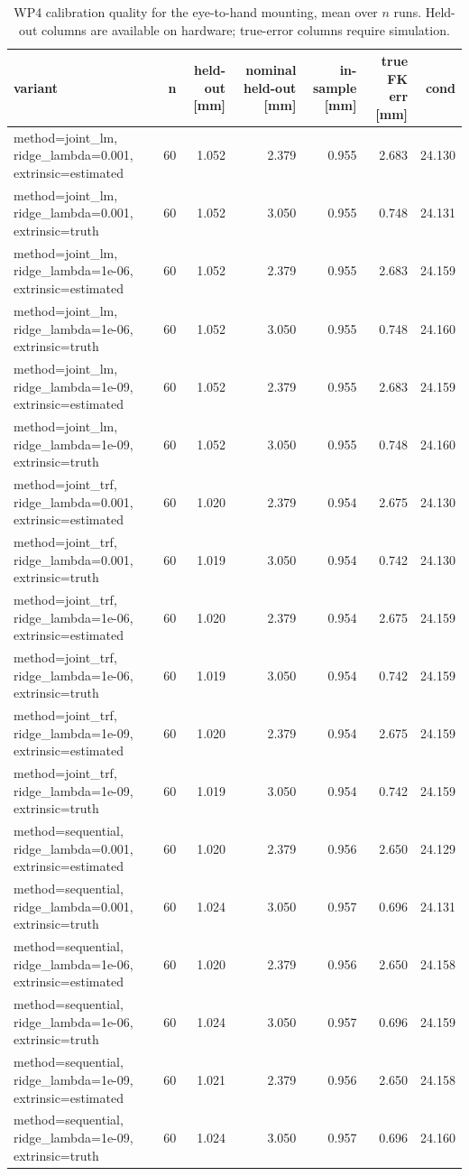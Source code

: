 \begin{table}[htbp]
  \centering
  \caption{WP4 calibration quality for the eye-to-hand mounting, mean over $n$ runs. Held-out columns are available on hardware; true-error columns require simulation.}
  \label{tab:wp4-summary-eye-to-hand}
  \begin{tabular}{lrrrrrr}
    \toprule
    variant & n & held-out [mm] & nominal held-out [mm] & in-sample [mm] & true FK err [mm] & cond \\
    \midrule
    method=joint\_lm, ridge\_lambda=0.001, extrinsic=estimated & 60 & 1.052 & 2.379 & 0.955 & 2.683 & 24.130 \\
    method=joint\_lm, ridge\_lambda=0.001, extrinsic=truth & 60 & 1.052 & 3.050 & 0.955 & 0.748 & 24.131 \\
    method=joint\_lm, ridge\_lambda=1e-06, extrinsic=estimated & 60 & 1.052 & 2.379 & 0.955 & 2.683 & 24.159 \\
    method=joint\_lm, ridge\_lambda=1e-06, extrinsic=truth & 60 & 1.052 & 3.050 & 0.955 & 0.748 & 24.160 \\
    method=joint\_lm, ridge\_lambda=1e-09, extrinsic=estimated & 60 & 1.052 & 2.379 & 0.955 & 2.683 & 24.159 \\
    method=joint\_lm, ridge\_lambda=1e-09, extrinsic=truth & 60 & 1.052 & 3.050 & 0.955 & 0.748 & 24.160 \\
    method=joint\_trf, ridge\_lambda=0.001, extrinsic=estimated & 60 & 1.020 & 2.379 & 0.954 & 2.675 & 24.130 \\
    method=joint\_trf, ridge\_lambda=0.001, extrinsic=truth & 60 & 1.019 & 3.050 & 0.954 & 0.742 & 24.130 \\
    method=joint\_trf, ridge\_lambda=1e-06, extrinsic=estimated & 60 & 1.020 & 2.379 & 0.954 & 2.675 & 24.159 \\
    method=joint\_trf, ridge\_lambda=1e-06, extrinsic=truth & 60 & 1.019 & 3.050 & 0.954 & 0.742 & 24.159 \\
    method=joint\_trf, ridge\_lambda=1e-09, extrinsic=estimated & 60 & 1.020 & 2.379 & 0.954 & 2.675 & 24.159 \\
    method=joint\_trf, ridge\_lambda=1e-09, extrinsic=truth & 60 & 1.019 & 3.050 & 0.954 & 0.742 & 24.159 \\
    method=sequential, ridge\_lambda=0.001, extrinsic=estimated & 60 & 1.020 & 2.379 & 0.956 & 2.650 & 24.129 \\
    method=sequential, ridge\_lambda=0.001, extrinsic=truth & 60 & 1.024 & 3.050 & 0.957 & 0.696 & 24.131 \\
    method=sequential, ridge\_lambda=1e-06, extrinsic=estimated & 60 & 1.020 & 2.379 & 0.956 & 2.650 & 24.158 \\
    method=sequential, ridge\_lambda=1e-06, extrinsic=truth & 60 & 1.024 & 3.050 & 0.957 & 0.696 & 24.159 \\
    method=sequential, ridge\_lambda=1e-09, extrinsic=estimated & 60 & 1.021 & 2.379 & 0.956 & 2.650 & 24.158 \\
    method=sequential, ridge\_lambda=1e-09, extrinsic=truth & 60 & 1.024 & 3.050 & 0.957 & 0.696 & 24.160 \\
    \bottomrule
  \end{tabular}
\end{table}

